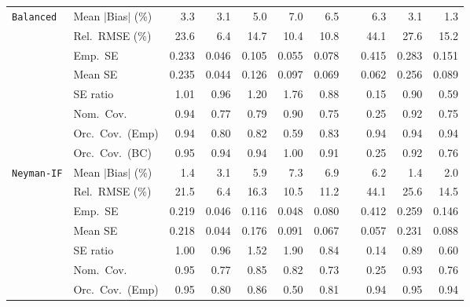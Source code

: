 \begin{landscape}
\begin{longtable}{llrrrrrrrrr}
\addlinespace[2pt]
\quad \texttt{Balanced} & Mean $|$Bias$|$ (\%) & \cellcolor{rankthree}3.3 & \cellcolor{ranktwo}3.1 & 5.0 & 7.0 & 6.5 &  & 6.3 & \cellcolor{ranktwo}3.1 & \cellcolor{rankone}1.3 \\
 & Rel.\ RMSE (\%) & 23.6 & \cellcolor{rankone}6.4 & 14.7 & \cellcolor{ranktwo}10.4 & \cellcolor{rankthree}10.8 &  & 44.1 & 27.6 & 15.2 \\
 & Emp.\ SE & 0.233 & 0.046 & 0.105 & 0.055 & 0.078 &  & 0.415 & 0.283 & 0.151 \\
 & Mean SE & 0.235 & 0.044 & 0.126 & 0.097 & 0.069 &  & 0.062 & 0.256 & 0.089 \\
 & SE ratio & \cellcolor{rankone}1.01 & \cellcolor{ranktwo}0.96 & 1.20 & 1.76 & 0.88 &  & 0.15 & \cellcolor{rankthree}0.90 & 0.59 \\
 & Nom.\ Cov. & \cellcolor{rankone}0.94 & 0.77 & 0.79 & \cellcolor{rankthree}0.90 & 0.75 &  & 0.25 & \cellcolor{ranktwo}0.92 & 0.75 \\
 & Orc.\ Cov.\ (Emp) & \cellcolor{rankone}0.94 & 0.80 & \cellcolor{rankthree}0.82 & 0.59 & \cellcolor{ranktwo}0.83 &  & \cellcolor{rankone}0.94 & \cellcolor{rankone}0.94 & \cellcolor{rankone}0.94 \\
 & Orc.\ Cov.\ (BC) & \cellcolor{rankone}0.95 & \cellcolor{ranktwo}0.94 & \cellcolor{ranktwo}0.94 & 1.00 & 0.91 &  & 0.25 & \cellcolor{rankthree}0.92 & 0.76 \\
\addlinespace[2pt]
\quad \texttt{Neyman-IF} & Mean $|$Bias$|$ (\%) & \cellcolor{rankone}1.4 & \cellcolor{rankthree}3.1 & 5.9 & 7.3 & 6.9 &  & 6.2 & \cellcolor{rankone}1.4 & \cellcolor{ranktwo}2.0 \\
 & Rel.\ RMSE (\%) & 21.5 & \cellcolor{rankone}6.4 & 16.3 & \cellcolor{ranktwo}10.5 & \cellcolor{rankthree}11.2 &  & 44.1 & 25.6 & 14.5 \\
 & Emp.\ SE & 0.219 & 0.046 & 0.116 & 0.048 & 0.080 &  & 0.412 & 0.259 & 0.146 \\
 & Mean SE & 0.218 & 0.044 & 0.176 & 0.091 & 0.067 &  & 0.057 & 0.231 & 0.088 \\
 & SE ratio & \cellcolor{rankone}1.00 & \cellcolor{ranktwo}0.96 & 1.52 & 1.90 & 0.84 &  & 0.14 & \cellcolor{rankthree}0.89 & 0.60 \\
 & Nom.\ Cov. & \cellcolor{rankone}0.95 & 0.77 & \cellcolor{rankthree}0.85 & 0.82 & 0.73 &  & 0.25 & \cellcolor{ranktwo}0.93 & 0.76 \\
 & Orc.\ Cov.\ (Emp) & \cellcolor{rankone}0.95 & 0.80 & \cellcolor{rankthree}0.86 & 0.50 & 0.81 &  & \cellcolor{ranktwo}0.94 & \cellcolor{rankone}0.95 & \cellcolor{ranktwo}0.94 \\

\end{longtable}
\end{landscape}
